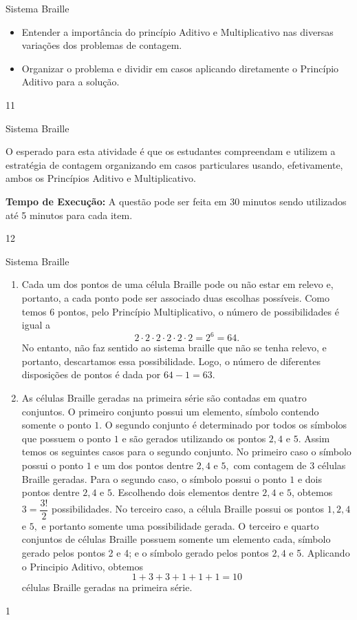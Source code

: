 \begin{objectives}{Sistema Braille}
{
\begin{itemize}
\item Entender a importância do princípio Aditivo e Multiplicativo nas diversas variações dos problemas de contagem. 
\item Organizar o problema e dividir em casos aplicando diretamente o Princípio Aditivo para a solução.
\end{itemize}
}{1}{1}
\end{objectives}
\clearmargin
\begin{sugestions}{Sistema Braille}
{
O esperado para esta atividade é que os estudantes compreendam e utilizem a  estratégia de contagem  organizando em casos particulares usando, efetivamente, ambos os Princípios Aditivo e Multiplicativo. 

\textbf{Tempo de Execução:} A questão pode ser feita em 30 minutos sendo utilizados até 5  minutos para cada item.
}{1}{2}
\end{sugestions}
\begin{answer}{Sistema Braille}
{
\begin{enumerate}
\item Cada um dos pontos de uma célula Braille pode ou não estar em relevo e, portanto, a cada ponto pode ser associado duas escolhas possíveis. Como temos 6 pontos, pelo Princípio Multiplicativo, o número de possibilidades é igual a $$2 \cdot 2 \cdot 2 \cdot 2 \cdot 2\cdot 2 = 2
^{6}=64.$$ No entanto, não faz sentido ao sistema braille que não  se tenha relevo, e portanto, descartamos essa possibilidade. Logo, o número de diferentes disposições de pontos é dada por $64-1=63.$

\item As células Braille geradas na primeira série são contadas em quatro conjuntos. O primeiro conjunto possui um elemento, símbolo contendo somente o ponto $1.$ O segundo conjunto é determinado por todos os símbolos que possuem o ponto $1$ e são gerados utilizando os pontos $2, 4$ e $5.$
Assim temos os seguintes casos para o segundo conjunto. No primeiro caso o símbolo possui o ponto $1$ e um dos pontos dentre $2,4$ e $5,$ com contagem de $3$ células Braille geradas. Para o segundo caso, o símbolo possui o ponto $1$ e dois pontos dentre $2,4$ e $5.$ Escolhendo dois elementos dentre  $2,4$ e $5$, obtemos $3=\dfrac{3!}{2}$ possibilidades. No terceiro caso, a célula Braille possui os pontos $1,2,4$ e $5,$ e portanto somente uma possibilidade gerada.
O terceiro e quarto conjuntos de células Braille possuem somente um elemento cada, símbolo gerado pelos pontos 2 e 4; e o símbolo gerado pelos pontos $2{,}4$ e 5. Aplicando o Principio Aditivo, obtemos  
$$1+3+3+1+1+1=10$$ 
células Braille geradas na primeira série.\end{enumerate}
}{1}
\end{answer}
